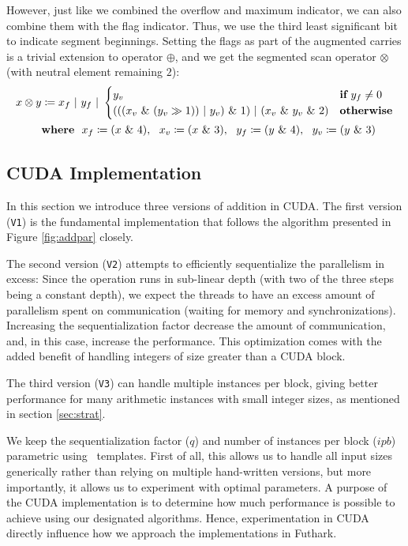 However, just like we combined the overflow and maximum indicator, we can also
combine them with the flag indicator. Thus, we use the third least significant
bit to indicate segment beginnings. Setting the flags as part of the augmented
carries is a trivial extension to operator $\oplus$, and we get the segmented scan
operator $\otimes$ (with neutral element remaining $2$):
\begin{align}
  \label{eq:segscanop}
  x \otimes y &\coloneq x_f~|~y_f~|~\begin{cases} y_v & \textbf{if}~y_f \neq 0 \\ (((x_v~\&~(y_v \gg 1))~|~y_v)~\&~1)~|~(x_v~\&~y_v~\&~2) & \textbf{otherwise}\end{cases}\\
  & \textbf{where}~~x_f\coloneq (x~\&~4),~~x_v\coloneq (x~\&~3),~~y_f\coloneq (y~\&~4),~~y_v\coloneq (y~\&~3)\notag
\end{align}

\subsection{CUDA Implementation}
\label{subsec:addcud}

In this section we introduce three versions of addition in CUDA. The first
version (\texttt{V1}) is the fundamental implementation that follows the
algorithm presented in Figure \ref{fig:addpar} closely.

The second version (\texttt{V2}) attempts to efficiently sequentialize the
parallelism in excess: Since the operation runs in sub-linear depth (with two of
the three steps being a constant depth), we expect the threads to have an excess
amount of parallelism spent on communication (waiting for memory and
synchronizations). Increasing the sequentialization factor decrease the amount
of communication, and, in this case, increase the performance. This optimization
comes with the added benefit of handling integers of size greater than a CUDA
block.

The third version (\texttt{V3}) can handle multiple instances per block, giving
better performance for many arithmetic instances with small integer sizes, as
mentioned in section \ref{sec:strat}.

We keep the sequentialization factor ($q$) and number of instances per block
($\mathit{ipb}$) parametric using \cpp\ templates. First of all, this allows us
to handle all input sizes generically rather than relying on multiple
hand-written versions, but more importantly, it allows us to experiment with
optimal parameters. A purpose of the CUDA implementation is to determine how
much performance is possible to achieve using our designated algorithms. Hence,
experimentation in CUDA directly influence how we approach the implementations
in Futhark.

